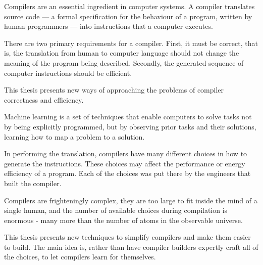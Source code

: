

Compilers are an essential ingredient in computer systems. A compiler translates source code --- a formal specification for the behaviour of a program, written by human programmers --- into instructions that a computer executes.

There are two primary requirements for a compiler. First, it must be correct, that is, the translation from human to computer language should not change the meaning of the program being described. Secondly, the generated sequence of computer instructions should be efficient. 

This thesis presents new ways of approaching the problems of compiler correctness and efficiency.

Machine learning is a set of techniques that enable computers to solve tasks not by being explicitly programmed, but by observing prior tasks and their solutions, learning how to map a problem to a solution.

In performing the translation, compilers have many different choices in how to generate the instructions. These choices may affect the performance or energy efficiency of a program. Each of the choices was put there by the engineers that built the compiler.

Compilers are frighteningly complex, they are too large to fit inside the mind of a single human, and the number of available choices during compilation is enormous - many more than the number of atoms in the observable universe.

This thesis presents new techniques to simplify compilers and make them easier to build. The main idea is, rather than have compiler builders expertly craft all of the choices, to let compilers learn for themselves.
